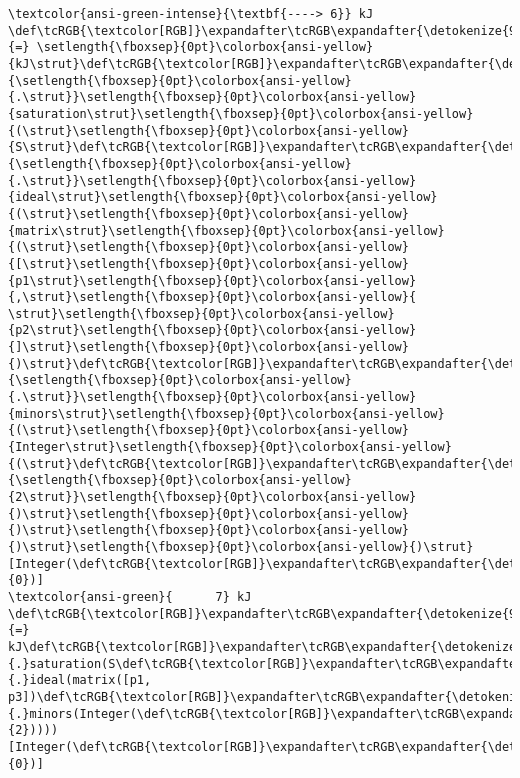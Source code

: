 \documentclass[11pt]{article}
\begin{document}
\begin{Verbatim}[commandchars=\\\{\}, frame=single, framerule=2mm, rulecolor=\color{outerrorbackground}]
\textcolor{ansi-green-intense}{\textbf{----> 6}} kJ \def\tcRGB{\textcolor[RGB]}\expandafter\tcRGB\expandafter{\detokenize{98,98,98}}{=} \setlength{\fboxsep}{0pt}\colorbox{ansi-yellow}{kJ\strut}\def\tcRGB{\textcolor[RGB]}\expandafter\tcRGB\expandafter{\detokenize{98,98,98}}{\setlength{\fboxsep}{0pt}\colorbox{ansi-yellow}{.\strut}}\setlength{\fboxsep}{0pt}\colorbox{ansi-yellow}{saturation\strut}\setlength{\fboxsep}{0pt}\colorbox{ansi-yellow}{(\strut}\setlength{\fboxsep}{0pt}\colorbox{ansi-yellow}{S\strut}\def\tcRGB{\textcolor[RGB]}\expandafter\tcRGB\expandafter{\detokenize{98,98,98}}{\setlength{\fboxsep}{0pt}\colorbox{ansi-yellow}{.\strut}}\setlength{\fboxsep}{0pt}\colorbox{ansi-yellow}{ideal\strut}\setlength{\fboxsep}{0pt}\colorbox{ansi-yellow}{(\strut}\setlength{\fboxsep}{0pt}\colorbox{ansi-yellow}{matrix\strut}\setlength{\fboxsep}{0pt}\colorbox{ansi-yellow}{(\strut}\setlength{\fboxsep}{0pt}\colorbox{ansi-yellow}{[\strut}\setlength{\fboxsep}{0pt}\colorbox{ansi-yellow}{p1\strut}\setlength{\fboxsep}{0pt}\colorbox{ansi-yellow}{,\strut}\setlength{\fboxsep}{0pt}\colorbox{ansi-yellow}{ \strut}\setlength{\fboxsep}{0pt}\colorbox{ansi-yellow}{p2\strut}\setlength{\fboxsep}{0pt}\colorbox{ansi-yellow}{]\strut}\setlength{\fboxsep}{0pt}\colorbox{ansi-yellow}{)\strut}\def\tcRGB{\textcolor[RGB]}\expandafter\tcRGB\expandafter{\detokenize{98,98,98}}{\setlength{\fboxsep}{0pt}\colorbox{ansi-yellow}{.\strut}}\setlength{\fboxsep}{0pt}\colorbox{ansi-yellow}{minors\strut}\setlength{\fboxsep}{0pt}\colorbox{ansi-yellow}{(\strut}\setlength{\fboxsep}{0pt}\colorbox{ansi-yellow}{Integer\strut}\setlength{\fboxsep}{0pt}\colorbox{ansi-yellow}{(\strut}\def\tcRGB{\textcolor[RGB]}\expandafter\tcRGB\expandafter{\detokenize{98,98,98}}{\setlength{\fboxsep}{0pt}\colorbox{ansi-yellow}{2\strut}}\setlength{\fboxsep}{0pt}\colorbox{ansi-yellow}{)\strut}\setlength{\fboxsep}{0pt}\colorbox{ansi-yellow}{)\strut}\setlength{\fboxsep}{0pt}\colorbox{ansi-yellow}{)\strut}\setlength{\fboxsep}{0pt}\colorbox{ansi-yellow}{)\strut}[Integer(\def\tcRGB{\textcolor[RGB]}\expandafter\tcRGB\expandafter{\detokenize{98,98,98}}{0})]
\textcolor{ansi-green}{      7} kJ \def\tcRGB{\textcolor[RGB]}\expandafter\tcRGB\expandafter{\detokenize{98,98,98}}{=} kJ\def\tcRGB{\textcolor[RGB]}\expandafter\tcRGB\expandafter{\detokenize{98,98,98}}{.}saturation(S\def\tcRGB{\textcolor[RGB]}\expandafter\tcRGB\expandafter{\detokenize{98,98,98}}{.}ideal(matrix([p1, p3])\def\tcRGB{\textcolor[RGB]}\expandafter\tcRGB\expandafter{\detokenize{98,98,98}}{.}minors(Integer(\def\tcRGB{\textcolor[RGB]}\expandafter\tcRGB\expandafter{\detokenize{98,98,98}}{2}))))[Integer(\def\tcRGB{\textcolor[RGB]}\expandafter\tcRGB\expandafter{\detokenize{98,98,98}}{0})]

\end{Verbatim}
\end{document}
